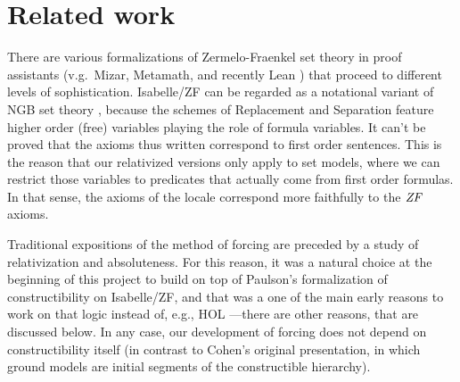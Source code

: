 \section{Related work}
\label{sec:related-work}


There are various formalizations of Zermelo-Fraenkel set theory in
proof assistants (v.g.\ Mizar, Metamath, and recently Lean
\cite{DBLP:conf/cade/MouraKADR15}) that proceed to different levels of
sophistication. Isabelle/ZF can be regarded as a notational variant of
NGB set theory \cite[Sect.~II.10]{kunen2011set}, because the schemes
of Replacement and Separation feature higher order (free) variables
playing the role of formula variables. It can't be proved that the
axioms thus written correspond to first order sentences. This is the
reason that our relativized versions only apply to set models, where
we can restrict those variables to predicates that actually come
from first order formulas. In that sense, the axioms of the locale
 correspond more faithfully to the
$\mathit{ZF}$ axioms.

Traditional expositions of the method of forcing
\cite{kunen2011set,Jech_Millennium} are preceded by a study of
relativization and absoluteness. For this reason, it was a natural
choice at the beginning of this project to build on top of Paulson's
formalization of constructibility on Isabelle/ZF, and that was a one
of the main early reasons to work on that logic instead of, e.g., HOL
---there are other reasons, that are discussed below. In any case, our
development of forcing does not depend on constructibility
itself (in contrast to Cohen's
original presentation, in which ground models are initial segments of the
constructible hierarchy).

